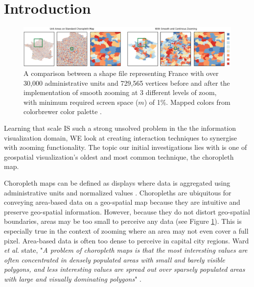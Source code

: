 \section{Introduction}
\begin{figure}[ht]
  \centering
  \includegraphics[width=\linewidth]{images/newTeaser}
  \caption{A comparison between a shape file representing France with over 30,000 administrative units and 729,565 vertices before and after the implementation of smooth zooming at 3 different levels of zoom, with minimum required screen space ($m$) of 1\%. Mapped colors from colorbrewer color palette \cite{colorbrewer}.  } \vspace{-0.2cm}
	\label{fig:teaser}
\end{figure}

Learning that scale IS such a strong unsolved problem in the the information visualization domain, WE look at creating interaction techniques to synergise with zooming functionality. The topic our initial investigations lies with is one of geospatial visualization's oldest and most common technique, the choropleth map.

Choropleth maps can be defined as displays where data is aggregated using administrative units and normalized values \cite{meirelles2013design}. Choropleths are ubiquitous for conveying area-based data on a geo-spatial map because they are intuitive and preserve geo-spatial information. However, because they do not distort geo-spatial boundaries, areas may be too small to perceive any data (see Figure \ref{fig:teaser}). This is especially true in the context of zooming where an area may not even cover a full pixel. Area-based data is often too dense to perceive in capital city regions. Ward \textit{et al.} state, "\emph{A problem of choropleth maps is that the most interesting values are often concentrated in densely populated areas with small and barely visible polygons, and less interesting values are spread out over sparsely populated areas with large and visually dominating polygons}" \cite{ward2010interactive}.


